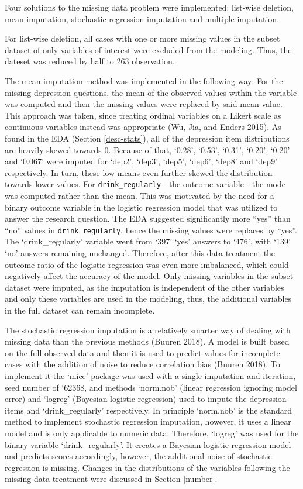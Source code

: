 \documentclass[
]{article}
\begin{document}
Four solutions to the missing data problem were implemented: list-wise deletion, mean imputation, stochastic regression imputation and multiple imputation.

For list-wise deletion, all cases with one or more missing values in the subset dataset of only variables of interest were excluded from the modeling. Thus, the dateset was reduced by half to 263 observation.

The mean imputation method was implemented in the following way: For the missing depression questions, the mean of the observed values within the variable was computed and then the missing values were replaced by said mean value. This approach was taken, since treating ordinal variables on a Likert scale as continuous variables instead was appropriate (Wu, Jia, and Enders 2015). As found in the EDA (Section \ref{desc-stats}), all of the depression item distributions are heavily skewed towards 0. Because of that, `0.28', `0.53', `0.31', `0.20', `0.20' and `0.067' were imputed for `dep2', `dep3', `dep5', `dep6', `dep8' and `dep9' respectively. In turn, these low means even further skewed the distribution towards lower values. For \texttt{drink\_regularly} - the outcome variable - the mode was computed rather than the mean. This was motivated by the need for a binary outcome variable in the logistic regression model that was utilized to answer the research question. The EDA suggested significantly more ``yes'' than ``no'' values in \texttt{drink\_regularly}, hence the missing values were replaces by ``yes''. The `drink\_regularly' variable went from `397' `yes' answers to `476', with `139' `no' answers remaining unchanged. Therefore, after this data treatment the outcome ratio of the logistic regression was even more imbalanced, which could negatively affect the accuracy of the model. Only missing variables in the subset dataset were imputed, as the imputation is independent of the other variables and only these variables are used in the modeling, thus, the additional variables in the full dataset can remain incomplete.

The stochastic regression imputation is a relatively smarter way of dealing with missing data than the previous methods (Buuren 2018). A model is built based on the full observed data and then it is used to predict values for incomplete cases with the addition of noise to reduce correlation bias (Buuren 2018). To implement it the `mice' package was used with a single imputation and iteration, seed number of `62368, and methods `norm.nob' (linear regression ignoring model error) and `logreg' (Bayesian logistic regression) used to impute the depression items and `drink\_regularly' respectively. In principle `norm.nob' is the standard method to implement stochastic regression imputation, however, it uses a linear model and is only applicable to numeric data. Therefore, `logreg' was used for the binary variable `drink\_regularly'. It creates a Bayesian logistic regression model and predicts scores accordingly, however, the additional noise of stochastic regression is missing. Changes in the distributions of the variables following the missing data treatment were discussed in Section {[}number{]}.
\end{document}
